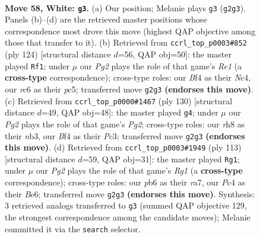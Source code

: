 \documentclass[11pt]{article}
\begin{document}
\clearpage

\begin{figure}[p]\centering
\begin{subfigure}{0.46\textwidth}\centering
\resizebox{\linewidth}{!}{%
\newchessgame
\chessboard[
  setfen={7r/p7/1pr1p1kp/n7/2PKPB2/N7/P5PR/1R6 w - - 9 58},
  showmover=false,
  pgfstyle=straightmove, color=movearrow, markmove={g2-g3}
]}
\caption{}
\end{subfigure}\hfill
\begin{subfigure}{0.46\textwidth}\centering
\resizebox{\linewidth}{!}{%
\newchessgame
\chessboard[
  setfen={3r4/2k5/r2pRpp1/2pP3n/2N2P1p/2K4P/1P4P1/4R3 w - - 4 63},
  showmover=false,
  pgfstyle=straightmove, color=movearrow, markmove={e1-f1}
]}
\caption{}
\end{subfigure}
\\[4pt]
\begin{subfigure}{0.46\textwidth}\centering
\resizebox{\linewidth}{!}{%
\newchessgame
\chessboard[
  setfen={r4r2/8/4k1p1/p2p4/2p2P2/1nP1B2P/R5PK/3R4 w - - 3 66},
  showmover=false,
  pgfstyle=straightmove, color=movearrow, markmove={g2-g4}
]}
\caption{}
\end{subfigure}\hfill
\begin{subfigure}{0.46\textwidth}\centering
\resizebox{\linewidth}{!}{%
\newchessgame
\chessboard[
  setfen={2r3r1/R4p2/4bk2/R1Ppn3/3Np3/2K1P2P/5P2/5B2 b - - 0 57},
  showmover=false,
  pgfstyle=straightmove, color=movearrow, markmove={g8-g1}
]}
\caption{}
\end{subfigure}
\caption{\textbf{Move 58, White: \texttt{g3}.} (a) Our position; Melanie plays \texttt{g3} (\texttt{g2g3}). Panels (b)--(d) are the retrieved master positions whose correspondence most drove this move (highest QAP objective among those that transfer to it). (b) Retrieved from \texttt{ccrl\_top\_p0003\#852} (ply 124) [structural distance $d$=56, QAP obj=50]: the master played \texttt{Rf1}; under $\mu$ our \emph{Pg2} plays the role of that game's \emph{Re1} (a \textbf{cross-type} correspondence); cross-type roles: our \emph{B}f4 as their \emph{N}c4, our \emph{r}c6 as their \emph{p}c5; transferred move \texttt{g2g3} \textbf{(endorses this move)}. (c) Retrieved from \texttt{ccrl\_top\_p0000\#1467} (ply 130) [structural distance $d$=49, QAP obj=48]: the master played \texttt{g4}; under $\mu$ our \emph{Pg2} plays the role of that game's \emph{Pg2}; cross-type roles: our \emph{r}h8 as their \emph{n}b3, our \emph{B}f4 as their \emph{P}c3; transferred move \texttt{g2g3} \textbf{(endorses this move)}. (d) Retrieved from \texttt{ccrl\_top\_p0003\#1949} (ply 113) [structural distance $d$=59, QAP obj=31]: the master played \texttt{Rg1}; under $\mu$ our \emph{Pg2} plays the role of that game's \emph{Rg1} (a \textbf{cross-type} correspondence); cross-type roles: our \emph{p}b6 as their \emph{r}a7, our \emph{P}c4 as their \emph{B}e6; transferred move \texttt{g2g3} \textbf{(endorses this move)}. Synthesis: 3 retrieved analogs transferred to \texttt{g3} (summed QAP objective 129, the strongest correspondence among the candidate moves); Melanie committed it via the \texttt{search} selector.}
\label{fig:thought-m114}
\end{figure}
\end{document}
